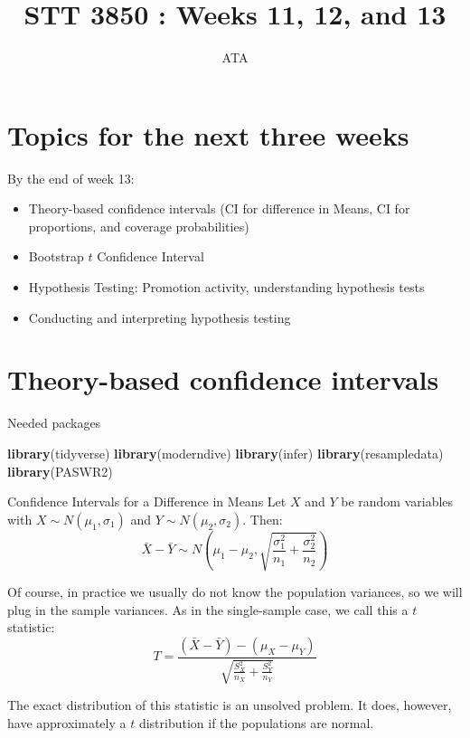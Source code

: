 \documentclass[
  ignorenonframetext,
]{beamer}
\title{STT 3850 : Weeks 11, 12, and 13}
\author{ATA}
\date{}
\institute{Appalachian State University}
\newenvironment{Shaded}{\begin{snugshade}}{\end{snugshade}}
\newcommand{\FunctionTok}[1]{\textcolor[rgb]{0.13,0.29,0.53}{\textbf{#1}}}
\newcommand{\NormalTok}[1]{#1}
\providecommand{\tightlist}{%
  \setlength{\itemsep}{0pt}\setlength{\parskip}{0pt}}
\begin{document}
\frame{\titlepage}

\section{Topics for the next three
weeks}\label{topics-for-the-next-three-weeks}

\begin{frame}{By the end of week 13:}
\label{by-the-end-of-week-13}
\begin{itemize}
\tightlist
\item
  Theory-based confidence intervals (CI for difference in Means, CI for
  proportions, and coverage probabilities)
\item
  Bootstrap \(t\) Confidence Interval
\item
  Hypothesis Testing: Promotion activity, understanding hypothesis tests
\item
  Conducting and interpreting hypothesis testing
\end{itemize}
\end{frame}

\section{Theory-based confidence
intervals}\label{theory-based-confidence-intervals}

\begin{frame}[fragile]{Needed packages}
\label{needed-packages}
\begin{Shaded}
\begin{Highlighting}[]
\FunctionTok{library}\NormalTok{(tidyverse)}
\FunctionTok{library}\NormalTok{(moderndive)}
\FunctionTok{library}\NormalTok{(infer)}
\FunctionTok{library}\NormalTok{(resampledata)}
\FunctionTok{library}\NormalTok{(PASWR2)}
\end{Highlighting}
\end{Shaded}
\end{frame}

\begin{frame}{Confidence Intervals for a Difference in Means}
\label{confidence-intervals-for-a-difference-in-means}
Let \(X\) and \(Y\) be random variables with
\(X\sim N(\mu_1, \sigma_1)\) and \(Y\sim N(\mu_2, \sigma_2)\). Then:
\[\bar{X}-\bar{Y}\sim N\left(\mu_1-\mu_2, \sqrt{\frac{\sigma_1^2}{n_1}+\frac{\sigma_2^2}{n_2}}\right)\]

Of course, in practice we usually do not know the population variances,
so we will plug in the sample variances. As in the single-sample case,
we call this a \(t\) statistic:
\[T=\frac{(\bar{X}-\bar{Y})-(\mu_X-\mu_Y)}{\sqrt{\frac{S^2_X}{n_X}+\frac{S^2_Y}{n_Y}}}\]

The exact distribution of this statistic is an unsolved problem. It
does, however, have approximately a \(t\) distribution if the
populations are normal.
\end{frame}
\end{document}
